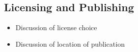 \documentclass{article}
\begin{document}
\begin{spacing}{1.1}
\begin{appendices}
\section{Licensing and Publishing}

\begin{itemize}
    \item Discussion of license choice
    \item Discussion of location of publication
\end{itemize}
\end{appendices}








\end{spacing}
\end{document}
